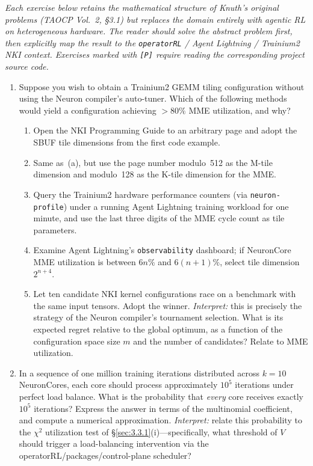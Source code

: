 \documentclass[12pt]{article}
\newcommand{\SBUF}{\textsc{SBUF}}                 %
\newcommand{\MME}{\textsc{MME}}                   %
\begin{document}
\noindent\emph{Each exercise below retains the mathematical structure of Knuth's original problems (TAOCP Vol.~2, \S3.1) but replaces the domain entirely with agentic RL on heterogeneous hardware. The reader should solve the abstract problem first, then explicitly map the result to the \texttt{operatorRL} / Agent Lightning / Trainium2 NKI context. Exercises marked with \texttt{[P]} require reading the corresponding project source code.}

\begin{enumerate}

\item[\textbf{1.}] [20] Suppose you wish to obtain a Trainium2 GEMM tiling configuration without using the Neuron compiler's auto-tuner. Which of the following methods would yield a configuration achieving $> 80\%$ \MME{} utilization, and why?

\begin{enumerate}
\item[a)] Open the NKI Programming Guide to an arbitrary page and adopt the \SBUF{} tile dimensions from the first code example.
\item[b)] Same as~(a), but use the page number modulo~512 as the M-tile dimension and modulo~128 as the K-tile dimension for the \MME{}.
\item[c)] Query the Trainium2 hardware performance counters (via \texttt{neuron-profile}) under a running Agent Lightning training workload for one minute, and use the last three digits of the \MME{} cycle count as tile parameters.
\item[d)] Examine Agent Lightning's \texttt{observability} dashboard; if NeuronCore \MME{} utilization is between $6n\%$ and $6(n+1)\%$, select tile dimension $2^{n+4}$.
\item[e)] Let ten candidate NKI kernel configurations race on a benchmark with the same input tensors. Adopt the winner. \emph{Interpret:} this is precisely the strategy of the Neuron compiler's tournament selection. What is its expected regret relative to the global optimum, as a function of the configuration space size $m$ and the number of candidates? Relate to \MME{} utilization.
\end{enumerate}

\item[\textbf{2.}] [$M22$] In a sequence of one million training iterations distributed across $k = 10$ NeuronCores, each core should process approximately $10^5$ iterations under perfect load balance. What is the probability that \emph{every} core receives exactly $10^5$ iterations? Express the answer in terms of the multinomial coefficient, and compute a numerical approximation. \emph{Interpret:} relate this probability to the $\chi^2$ utilization test of \S\ref{sec:3.3.1}(i)---specifically, what threshold of $V$ should trigger a load-balancing intervention via the 
operatorRL/packages/control-plane scheduler?


\end{enumerate}
\end{document}
